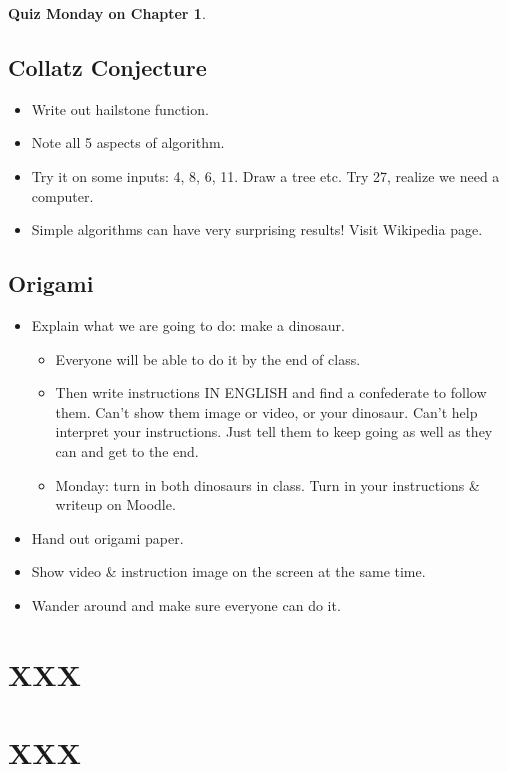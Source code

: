 \documentclass{article}
\begin{document}
\textbf{Quiz Monday on Chapter 1}.

\subsection*{Collatz Conjecture}

\begin{itemize}
\item Write out hailstone function.
\item Note all 5 aspects of algorithm.
\item Try it on some inputs: 4, 8, 6, 11. Draw a tree etc.  Try 27,
  realize we need a computer.
\item Simple algorithms can have very surprising results!  Visit
  Wikipedia page.
\end{itemize}

\subsection*{Origami}

\begin{itemize}
\item Explain what we are going to do: make a dinosaur.
  \begin{itemize}
  \item Everyone will be able to do it by the end of class.
  \item Then write instructions IN ENGLISH and find a confederate to
    follow them.  Can't show them image or video, or your dinosaur.
    Can't help interpret your instructions.  Just tell them to keep
    going as well as they can and get to the end.
  \item Monday: turn in both dinosaurs in class.  Turn in your
    instructions \& writeup on Moodle.
  \end{itemize}

\item Hand out origami paper.
\item Show video \& instruction image on the screen at the same time.
\item Wander around and make sure everyone can do it.
\end{itemize}

\section{XXX}

\section{XXX}
\end{document}
